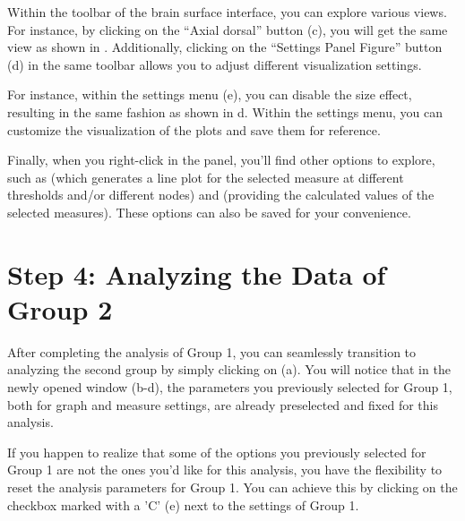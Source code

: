 \documentclass[justified]{tufte-handout}
\begin{document}
Within the toolbar of the brain surface interface, you can explore various views.
 For instance, by clicking on the “Axial dorsal” button (c), you will get the same view as shown in . Additionally, clicking on the “Settings Panel Figure” button (d) in the same toolbar allows you to adjust different visualization settings.

For instance, within the settings menu (e), you can disable the size effect, resulting in the same fashion as shown in d. Within the settings menu, you can customize the visualization of the plots and save them for reference.

Finally, when you right-click in the  panel, you'll find other options to explore, such as  (which generates a line plot for the selected measure at different thresholds and/or different nodes) and  (providing the calculated values of the selected measures). These options can also be saved for your convenience.

\section{Step 4: Analyzing the Data of Group 2}

After completing the analysis of Group 1, you can seamlessly transition to analyzing the second group by simply clicking on  (a). You will notice that in the newly opened window (b-d), the parameters you previously selected for Group 1, both for graph and measure settings, are already preselected and fixed for this analysis. 

If you happen to realize that some of the options you previously selected for Group 1 are not the ones you'd like for this analysis, you have the flexibility to reset the analysis parameters for Group 1. You can achieve this by clicking on the checkbox marked with a 'C' (e) next to the settings of Group 1.
\end{document}
